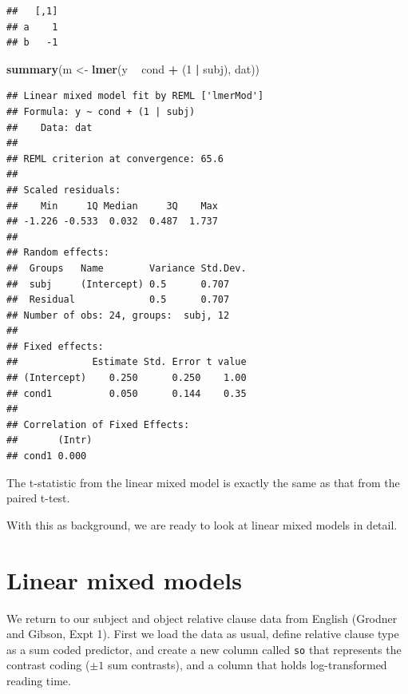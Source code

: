 \documentclass[12pt,]{krantz}
\newenvironment{Shaded}{\begin{snugshade}}{\end{snugshade}}
\newcommand{\DataTypeTok}[1]{\textcolor[rgb]{0.13,0.29,0.53}{#1}}
\newcommand{\DecValTok}[1]{\textcolor[rgb]{0.00,0.00,0.81}{#1}}
\newcommand{\KeywordTok}[1]{\textcolor[rgb]{0.13,0.29,0.53}{\textbf{#1}}}
\newcommand{\NormalTok}[1]{#1}
\newcommand{\OperatorTok}[1]{\textcolor[rgb]{0.81,0.36,0.00}{\textbf{#1}}}
\newcommand{\OtherTok}[1]{\textcolor[rgb]{0.56,0.35,0.01}{#1}}
\newcommand{\StringTok}[1]{\textcolor[rgb]{0.31,0.60,0.02}{#1}}
\begin{document}
\begin{verbatim}
##   [,1]
## a    1
## b   -1
\end{verbatim}

\begin{Shaded}
\begin{Highlighting}[]
\KeywordTok{summary}\NormalTok{(m <-}\StringTok{ }\KeywordTok{lmer}\NormalTok{(y }\OperatorTok{~}\StringTok{ }\NormalTok{cond }\OperatorTok{+}\StringTok{ }\NormalTok{(}\DecValTok{1} \OperatorTok{|}\StringTok{ }\NormalTok{subj), }
\NormalTok{  dat))}
\end{Highlighting}
\end{Shaded}

\begin{verbatim}
## Linear mixed model fit by REML ['lmerMod']
## Formula: y ~ cond + (1 | subj)
##    Data: dat
## 
## REML criterion at convergence: 65.6
## 
## Scaled residuals: 
##    Min     1Q Median     3Q    Max 
## -1.226 -0.533  0.032  0.487  1.737 
## 
## Random effects:
##  Groups   Name        Variance Std.Dev.
##  subj     (Intercept) 0.5      0.707   
##  Residual             0.5      0.707   
## Number of obs: 24, groups:  subj, 12
## 
## Fixed effects:
##             Estimate Std. Error t value
## (Intercept)    0.250      0.250    1.00
## cond1          0.050      0.144    0.35
## 
## Correlation of Fixed Effects:
##       (Intr)
## cond1 0.000
\end{verbatim}

The t-statistic from the linear mixed model is exactly the same as that from the paired t-test.

With this as background, we are ready to look at linear mixed models in detail.

\hypertarget{linear-mixed-models}{%
\section{Linear mixed models}\label{linear-mixed-models}}

We return to our subject and object relative clause data from English (Grodner and Gibson, Expt 1). First we load the data as usual, define relative clause type as a sum coded predictor, and create a new column called \texttt{so} that represents the contrast coding (\(\pm 1\) sum contrasts), and a column that holds log-transformed reading time.

\begin{Shaded}
\end{Shaded}
\end{document}
